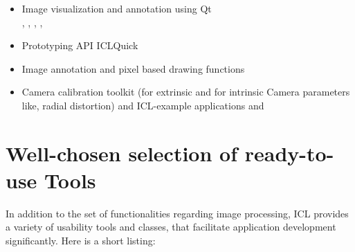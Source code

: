\begin{itemize}
\item Image visualization and annotation using Qt\\
, , , ,

\item Prototyping API ICLQuick\\

\item Image annotation and pixel based drawing functions\\

\item Camera calibration toolkit (for extrinsic and for intrinsic Camera parameters like, radial distortion)
 and ICL-example applications  and 

\end{itemize}



\section{Well-chosen selection of ready-to-use Tools}
In addition to the set of functionalities regarding image processing, ICL provides a variety of usability tools and classes, that facilitate application development significantly. Here is a short listing:

